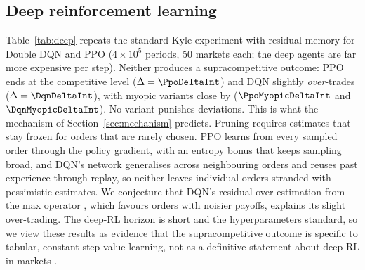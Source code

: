 \subsection{Deep reinforcement learning}
\label{sec:deep}

Table~\ref{tab:deep} repeats the standard-Kyle experiment with residual memory
for Double DQN and PPO ($4\times10^5$ periods, 50 markets each; the deep agents
are far more expensive per step). Neither produces a supracompetitive outcome:
PPO ends at the competitive level ($\Delta=\PpoDeltaInt$) and DQN slightly
\emph{over}-trades ($\Delta=\DqnDeltaInt$), with myopic variants close by
($\PpoMyopicDeltaInt$ and $\DqnMyopicDeltaInt$). No variant punishes deviations.
This is what the mechanism of Section~\ref{sec:mechanism} predicts. Pruning
requires estimates that stay frozen for orders that are rarely chosen. PPO
learns from every sampled order through the policy gradient, with an entropy
bonus that keeps sampling broad, and DQN's network generalises across
neighbouring orders and reuses past experience through replay, so neither
leaves individual orders stranded with pessimistic estimates. We conjecture
that DQN's residual over-estimation from the max operator
\citep{thrun1993,vanhasselt2016}, which favours orders with noisier payoffs,
explains its slight over-trading. The deep-RL horizon is short and the
hyperparameters standard, so we view these results as evidence that the
supracompetitive outcome is specific to tabular, constant-step value learning,
not as a definitive statement about deep RL in markets
\citep[cf.][]{deng2024}.

\begin{table}[t]
  \centering
  \small
  \resizebox{0.9\linewidth}{!}{}
  \caption{Learning algorithms in the standard Kyle market ($\xi=0$, $I=2$,
  residual memory). Tabular Q: 600 markets, $6\times10^6$ periods; DQN and
  PPO: 50 markets, $4\times10^5$ periods. 95\% CIs.}
  \label{tab:deep}
\end{table}
